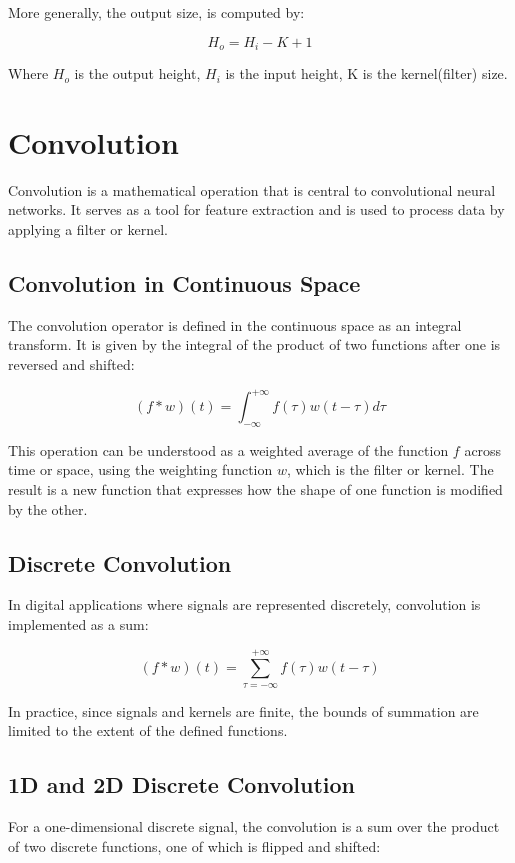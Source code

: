More generally, the output size, is computed by:

\[
    H_o = H_i - K + 1
\]

Where \(H_o\) is the output height, \(H_i\) is the input height, K is the kernel(filter) size.


\section{Convolution}

Convolution is a mathematical operation that is central to convolutional neural networks. It serves as a tool for feature extraction and is used to process data by applying a filter or kernel.

\subsection{Convolution in Continuous Space}

The convolution operator is defined in the continuous space as an integral transform. It is given by the integral of the product of two functions after one is reversed and shifted:

\[
(f * w)(t) = \int_{-\infty}^{+\infty} f(\tau) w(t - \tau) d\tau
\]

This operation can be understood as a weighted average of the function \( f \) across time or space, using the weighting function \( w \), which is the filter or kernel. The result is a new function that expresses how the shape of one function is modified by the other.

\subsection{Discrete Convolution}

In digital applications where signals are represented discretely, convolution is implemented as a sum:

\[
(f * w)(t) = \sum_{\tau=-\infty}^{+\infty} f(\tau) w(t - \tau)
\]

In practice, since signals and kernels are finite, the bounds of summation are limited to the extent of the defined functions.

\subsection{1D and 2D Discrete Convolution}

For a one-dimensional discrete signal, the convolution is a sum over the product of two discrete functions, one of which is flipped and shifted:

